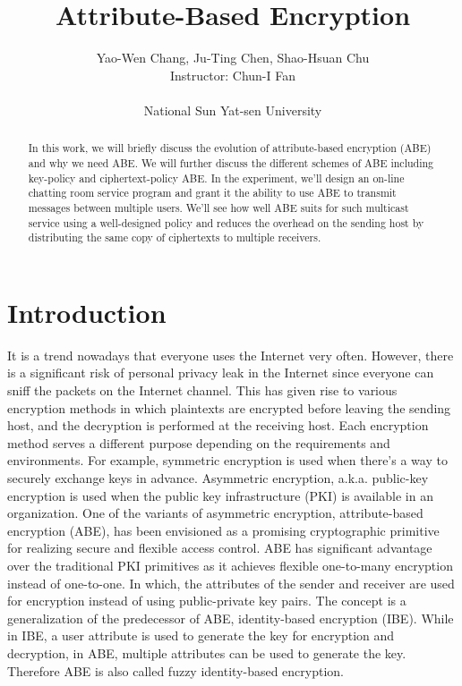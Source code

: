 \documentclass[12pt]{article}
\title{
Attribute-Based Encryption
}
\author{
Yao-Wen Chang, Ju-Ting Chen, Shao-Hsuan Chu \\
Instructor: Chun-I Fan \\
\\
National Sun Yat-sen University
}
\begin{document}
\maketitle
\begin{abstract}
In this work, we will briefly discuss the evolution of attribute-based encryption (ABE) and why we need ABE. We will further discuss the different schemes of ABE including key-policy and ciphertext-policy ABE. In the experiment, we’ll design an on-line chatting room service program and grant it the ability to use ABE to transmit messages between multiple users. We’ll see how well ABE suits for such multicast service using a well-designed policy and reduces the overhead on the sending host by distributing the same copy of ciphertexts to multiple receivers.
\end{abstract}
\newpage
\tableofcontents
\newpage


\section{Introduction}
It is a trend nowadays that everyone uses the Internet very often. However,  there is a significant risk of personal privacy leak in the Internet since everyone can sniff the packets on the Internet channel. This has given rise to various encryption methods in which plaintexts are encrypted before leaving the sending host, and the decryption is performed at the receiving host. Each encryption method serves a different purpose depending on the requirements and environments. For example, symmetric encryption is used when there’s a way to securely exchange keys in advance. Asymmetric encryption, a.k.a. public-key encryption is used when the public key infrastructure (PKI) is available in an organization. One of the variants of asymmetric encryption, attribute-based encryption (ABE), has been envisioned as a promising cryptographic primitive for realizing secure and flexible access control. ABE has significant advantage over the traditional PKI primitives as it achieves flexible one-to-many encryption instead of one-to-one. In which, the attributes of the sender and receiver are used for encryption instead of using public-private key pairs. The concept is a generalization of the predecessor of ABE, identity-based encryption (IBE). While in IBE, a user attribute is used to generate the key for encryption and decryption, in ABE, multiple attributes can be used to generate the key. Therefore ABE is also called fuzzy identity-based encryption.
\end{document}
